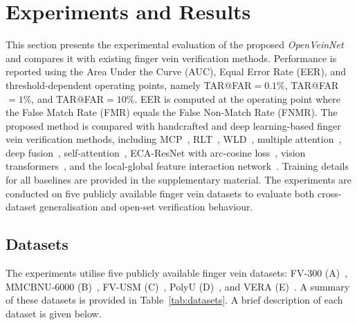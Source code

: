 \documentclass[10pt,journal,compsoc]{IEEEtran}
\begin{document}
\section{Experiments and Results}
\label{sec:experiments}

This section presents the experimental evaluation of the proposed \textit{OpenVeinNet} and compares it with existing finger vein verification methods. Performance is reported using the Area Under the Curve (AUC), Equal Error Rate (EER), and threshold-dependent operating points, namely TAR@FAR$=0.1\%$, TAR@FAR$=1\%$, and TAR@FAR$=10\%$. EER is computed at the operating point where the False Match Rate (FMR) equals the False Non-Match Rate (FNMR). The proposed method is compared with handcrafted and deep learning-based finger vein verification methods, including MCP~\cite{surveyonmanualfeatures}, RLT~\cite{surveyonmanualfeatures}, WLD~\cite{surveyonmanualfeatures}, multiple attention~\cite{binma}, deep fusion~\cite{ism}, self-attention~\cite{veinatnnet}, ECA-ResNet with arc-cosine loss~\cite{arcvein}, vision transformers~\cite{vit}, and the local-global feature interaction network~\cite{lgfin}. Training details for all baselines are provided in the supplementary material. The experiments are conducted on five publicly available finger vein datasets to evaluate both cross-dataset generalisation and open-set verification behaviour.

\subsection{Datasets}

The experiments utilise five publicly available finger vein datasets: FV-300 (A)~\cite{veinatnnet}, MMCBNU-6000 (B)~\cite{mmcbnu}, FV-USM (C)~\cite{fvusm}, PolyU (D)~\cite{polyu}, and VERA (E)~\cite{vera}. A summary of these datasets is provided in Table~\ref{tab:datasets}. A brief description of each dataset is given below.
\end{document}
